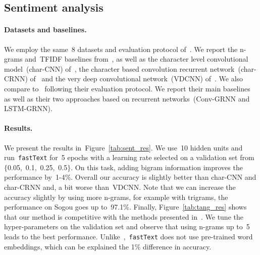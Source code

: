 \subsection{Sentiment analysis}

\paragraph{Datasets and baselines.}
We employ the same~8 datasets and evaluation protocol of~.
We report the n-grams and~TFIDF baselines from~, as
well as the character level convolutional model~(char-CNN)
of~, the character based convolution recurrent
network~(char-CRNN) of~\cite{xiao2016efficient} and the very deep convolutional
network~(VDCNN) of~.
We also compare to~ following their evaluation protocol.
We report their main baselines as well as their two approaches based on recurrent
networks~(Conv-GRNN and LSTM-GRNN). 

\paragraph{Results.}
We present the results in~Figure~\ref{tab:sent_res}.
We use~10 hidden units and run~\texttt{fastText} for~5 epochs with a learning rate selected
on a validation set from~$\{$0.05,~0.1,~0.25,~0.5$\}$.
On this task, adding bigram information improves the performance by~1-4$\%$. 
Overall our accuracy is slightly better than char-CNN and char-CRNN and, a bit worse than~VDCNN.
Note that we can increase the accuracy slightly by using more n-grams, for example
with trigrams, the performance on Sogou goes up to~97.1$\%$. 
Finally, Figure~\ref{tab:tang_res} shows that our method is competitive with the methods presented
in~. We tune the hyper-parameters on the validation set and observe
that using n-grams up to~5 leads to the best performance.
Unlike~,~\texttt{fastText} does not use pre-trained word embeddings, which
can be explained the 1$\%$ difference in accuracy.

